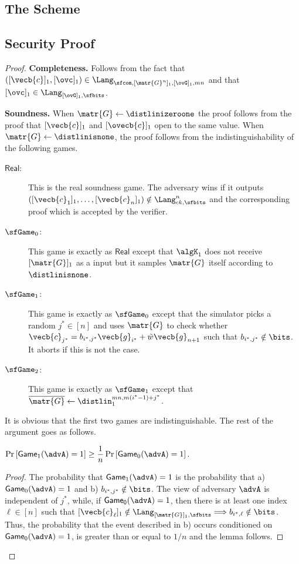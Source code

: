 \iffull
\else
\subsection{The Scheme}
    
\fi
\subsection{Security Proof}

\begin{proof}
{\bf Completeness.}
Follows from the fact that $([\vecb{c}]_1,[\ovc]_1)\in\Lang_{\sfcom,[\matr{G}^n]_1,[\ovG]_1,mn}$ and that $[\ovc]_1\in\Lang_{[\ovG]_1,\sfbits}$.

{\bf Soundness.}
When $\matr{G}\gets\distlinizeroone$ the proof follows from the proof that $[\vecb{c}]_1$ and $[\ovecb{c}]_1$ open to the same value.
When $\matr{G}\gets\distlinisnone$, the proof follows from the indistinguishability of the following games.

\begin{description}
\item[$\mathsf{Real}$:] This is the real soundness game. The adversary wins if it outputs $([\vecb{c}_1]_1,\ldots,[\vecb{c}_n]_1)\notin\Lang_{ck,\sfbits}^n$ and the corresponding proof which is accepted by the verifier.
\item[$\sfGame_0$:] This game is exactly as $\mathsf{Real}$ except that $\algK_1$ does not receive $[\matr{G}]_1$ as a input but it samples $\matr{G}$ itself according to $\distlinisnone$.
\item[$\sfGame_1$:] This game is exactly as $\sfGame_0$ except that the simulator picks a random $j^*\in[n]$ and uses $\matr{G}$ to check whether $\vecb{c}_{j^*}=b_{i^*,j^*}\vecb{g}_{i^*}+\tilde{w}\vecb{g}_{n+1}$ such that $b_{i^*,j^*}\notin\bits$. It aborts if this is not the case.
\item[$\sfGame_2$:] This game is exactly as $\sfGame_1$ except that $\overline{\matr{G}}\gets\distlin_1^{mn, m(i^*-1)+j^*}$.
\end{description}

It is obvious that the first two games are indistinguishable. 
The rest of the argument goes as follows. 

\begin{lemma} $\Pr\left[ \mathsf{Game}_1(\advA)=1\right]\geq\dfrac{1}{n}\Pr\left[\mathsf{Game}_0(\advA)=1\right].$
\end{lemma}

\begin{proof}  The probability that
 $\mathsf{Game}_1(\advA)=1$ is the probability that  a) $\mathsf{Game}_0(\advA)=1$ and
b)  $b_{i^*,j^*} \notin \bits$. The view of adversary $\advA$ is independent of $j^*$, while, if $\mathsf{Game_0}(\advA)=1$, then there is at least one index $\ell \in [n]$ such that $[\vecb{c}_\ell]_1\notin\Lang_{[\matr{G}]_1,\sfbits}\Longrightarrow b_{i^*,\ell} \notin \bits$. Thus, 
the probability that the event described in b) occurs conditioned on $\mathsf{Game_0}(\advA)=1$, is greater than or equal to $1/n$ and the lemma follows.
\end{proof}


\end{proof}
